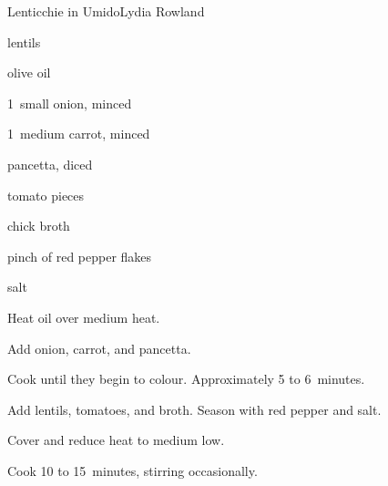 \begin{recipe}{Lenticchie in Umido}{Lydia Rowland}{}

\begin{ingredients}
\item {} lentils
\item \C{\third} olive oil
\item 1~small onion, minced
\item 1~medium carrot, minced
\item {} pancetta, diced
\item {} tomato pieces
\item {} chick broth
\item pinch of red pepper flakes
\item salt
\end{ingredients}

\begin{directions}
\item Heat oil over medium heat.
\item Add onion, carrot, and pancetta.
\item Cook until they begin to colour. Approximately 5 to 6~minutes.
\item Add lentils, tomatoes, and broth. Season with red pepper and salt.
\item Cover and reduce heat to medium low.
\item Cook 10 to 15~minutes, stirring occasionally.
\end{directions}

\end{recipe}
